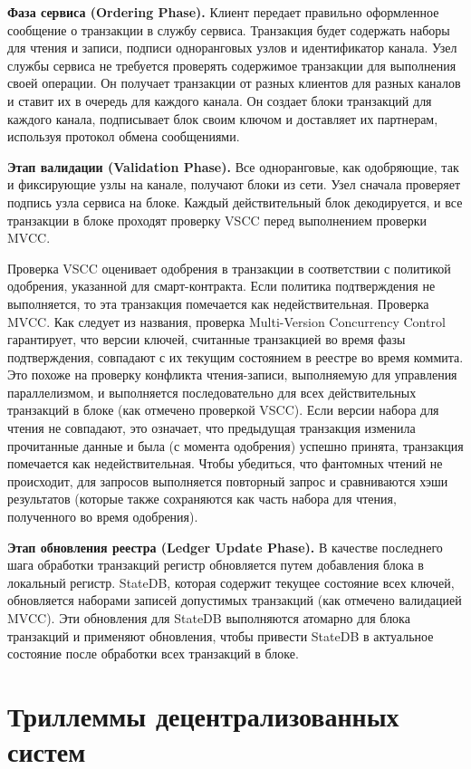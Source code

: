 \textbf{Фаза сервиса (Ordering Phase).} Клиент передает правильно оформленное сообщение о транзакции в службу сервиса. Транзакция будет содержать наборы для чтения и записи, подписи одноранговых узлов и идентификатор канала. Узел службы сервиса не требуется проверять содержимое транзакции для выполнения своей операции. Он получает транзакции от разных клиентов для разных каналов и ставит их в очередь для каждого канала. Он создает блоки транзакций для каждого канала, подписывает блок своим ключом и доставляет их партнерам, используя протокол обмена сообщениями.

\textbf{Этап валидации (Validation Phase).} Все одноранговые, как одобряющие, так и фиксирующие узлы на канале, получают блоки из сети. Узел сначала проверяет подпись узла сервиса на блоке. Каждый действительный блок декодируется, и все транзакции в блоке проходят проверку VSCC перед выполнением проверки MVCC.

Проверка	VSCC	оценивает	одобрения	в	транзакции	в		соответствии	с политикой	одобрения,		указанной	для	смарт-контракта.		Если	политика подтверждения не выполняется, то эта транзакция помечается как недействительная. Проверка MVCC. Как следует из названия, проверка Multi-Version Concurrency Control гарантирует, что версии ключей, считанные транзакцией во время фазы подтверждения, совпадают с их текущим состоянием в реестре во время коммита. Это похоже на проверку конфликта чтения-записи, выполняемую для управления параллелизмом, и выполняется последовательно для всех действительных транзакций в блоке (как отмечено проверкой VSCC). Если версии набора для чтения не совпадают, это означает, что предыдущая транзакция изменила прочитанные данные и была (с момента одобрения) успешно принята, транзакция помечается как недействительная. Чтобы убедиться, что фантомных чтений не происходит, для запросов выполняется повторный запрос и сравниваются хэши результатов (которые также сохраняются как часть набора для чтения, полученного во время одобрения).

\textbf{Этап обновления реестра (Ledger Update Phase).} В качестве последнего шага обработки транзакций регистр обновляется путем добавления блока в локальный регистр. StateDB, которая содержит текущее состояние всех ключей, обновляется наборами записей допустимых транзакций (как отмечено валидацией MVCC). Эти обновления для StateDB выполняются атомарно для блока транзакций и применяют обновления, чтобы привести StateDB в актуальное состояние после обработки всех транзакций в блоке.

\section{Триллеммы децентрализованных систем} \label{sec:ch1/sec4}


